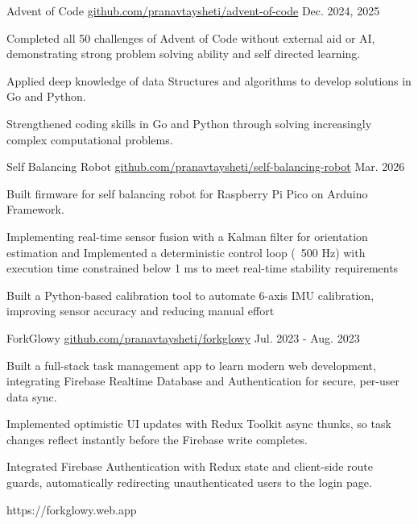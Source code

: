 
\begin{cventries}
	\cvproentry
	{Advent of Code} %
	{\href{https://github.com/pranavtaysheti/advent-of-code}{github.com/pranavtaysheti/advent-of-code}} %
	{Dec. 2024, 2025} %
	{
		\begin{cvitems}
			\item {
			            Completed all 50 challenges of Advent of Code without external aid or
			            AI, demonstrating strong problem solving ability and self directed
			            learning.
			      }
			\item {
			            Applied deep knowledge of data Structures and algorithms to develop
			            solutions in Go and Python.
			      }
			\item {
			            Strengthened coding skills in Go and Python through solving increasingly
			            complex computational problems.
			      }
		\end{cvitems}
	}
	{} %

	\cvproentry
	{Self Balancing Robot} %
	{\href{https://github.com/pranavtaysheti/self-balancing-robot}{github.com/pranavtaysheti/self-balancing-robot}} %
	{Mar. 2026} %
	{
		\begin{cvitems}
			\item {
				Built firmware for self balancing robot for Raspberry Pi Pico on Arduino Framework.
			}
			\item {
				Implementing real-time sensor fusion with a Kalman filter for orientation estimation and 
				Implemented a deterministic control loop (~500 Hz) with execution time constrained below 1 ms 
				to meet real-time stability requirements
			}
			\item {
				Built a Python-based calibration tool to automate 6-axis IMU calibration, improving sensor accuracy 
				and reducing manual effort
			}
		\end{cvitems}
	}
	{} %

	\cvproentry
	{ForkGlowy} %
	{\href{https://github.com/pranavtaysheti/forkglowy}{github.com/pranavtaysheti/forkglowy}} %
	{Jul. 2023 - Aug. 2023} %
	{
		\begin{cvitems}
			\item {
				Built a full-stack task management app to learn modern web 
				development, integrating Firebase Realtime Database and 
				Authentication for secure, per-user data sync.
			}
			\item {
				Implemented optimistic UI updates with Redux Toolkit async 
				thunks, so task changes reflect instantly before the Firebase 
				write completes.
			}
			\item {
				Integrated Firebase Authentication with Redux state and client-side
				route guards, automatically redirecting unauthenticated users to 
				the login page.
			}
		\end{cvitems}
	}
	{https://forkglowy.web.app} %
\end{cventries}
